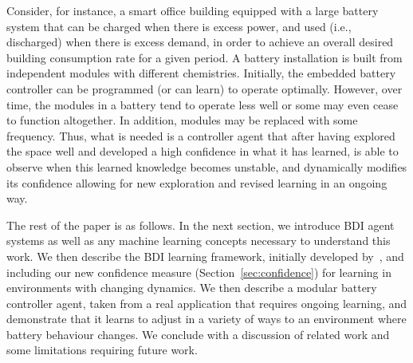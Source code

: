 Consider, for instance, a smart office building equipped with a large battery system that can be charged when there is excess power, and used (i.e., discharged) when there is excess demand, in order to achieve an overall desired building consumption rate for a given period. A battery installation is built from independent modules with different chemistries. Initially, the embedded battery controller can be programmed (or can learn) to operate optimally. However, over time, the modules in a battery tend to operate less well or some may even cease to function altogether. In addition, modules may be replaced with some frequency.  
Thus, what is needed is a controller agent that after having explored the space well and developed a high confidence in what it has learned, is able to observe when this learned knowledge becomes unstable, and dynamically modifies its confidence allowing for new exploration and revised learning
in an ongoing way.

The rest of the paper is as follows.
%
In the next section, we introduce BDI agent systems as well as any machine learning concepts necessary to understand this work. 
%
We then describe the BDI learning framework, initially developed by~\cite{airiau09:enhancing,singh10:extending,singh10:learning}, and including our new confidence measure (Section~\ref{sec:confidence}) for learning in environments with changing dynamics. 
%
We then describe a modular battery controller agent, taken from a real application that requires ongoing learning, and demonstrate that it learns to adjust in a variety of ways to an environment where battery behaviour changes. 
%
We conclude with a discussion of related work and some limitations requiring future work.




